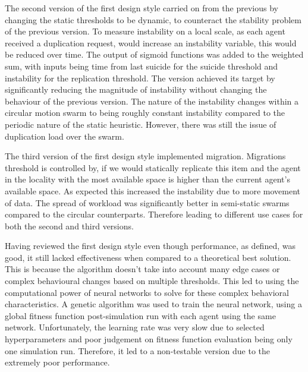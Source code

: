 \documentclass{UoYCSproject}
\begin{document}
\begin{summary}
The second version of the first design style carried on from the previous by changing the static thresholds to be dynamic, to counteract the stability problem of the previous version. To measure instability on a local scale, as each agent received a duplication request, would increase an instability variable, this would be reduced over time. The output of sigmoid functions was added to the weighted sum, with inputs being time from last suicide for the suicide threshold and instability for the replication threshold. The version achieved its target by significantly reducing the magnitude of instability without changing the behaviour of the previous version. The nature of the instability changes within a circular motion swarm to being roughly constant instability compared to the periodic nature of the static heuristic. However, there was still the issue of duplication load over the swarm.

The third version of the first design style implemented migration. Migrations threshold is controlled by, if we would statically replicate this item and the agent in the locality with the most available space is higher than the current agent's available space. As expected this increased the instability due to more movement of data. The spread of workload was significantly better in semi-static swarms compared to the circular counterparts. Therefore leading to different use cases for both the second and third versions.


Having reviewed the first design style even though performance, as defined, was good, it still lacked effectiveness when compared to a theoretical best solution. This is because the algorithm doesn’t take into account many edge cases or complex behavioural changes based on multiple thresholds. This led to using the computational power of neural networks to solve for these complex behavioral characteristics. A genetic algorithm was used to train the neural network, using a global fitness function post-simulation run with each agent using the same network. Unfortunately, the learning rate was very slow due to selected hyperparameters and poor judgement on fitness function evaluation being only one simulation run. Therefore, it led to a non-testable version due to the extremely poor performance.


\end{summary}
\end{document}
